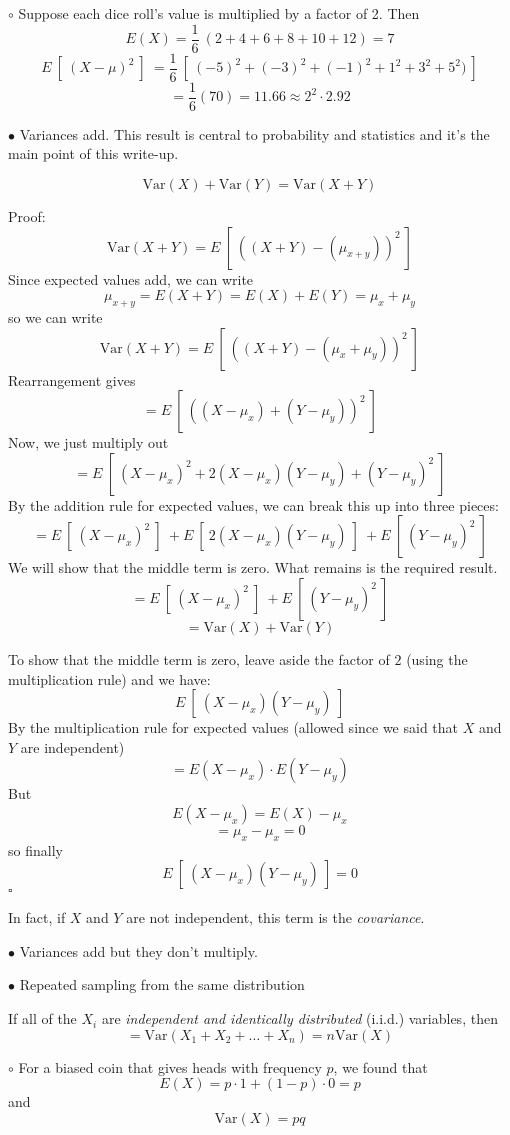 \documentclass[11pt, oneside]{article}   	%
\begin{document}
$\circ$ Suppose each dice roll's value is multiplied by a factor of 2.  Then
\[ E(X) = \frac{1}{6} \ (2 + 4 + 6 + 8 + 10 + 12) = 7 \]
\[ E \ [ \ (X - \mu)^2 \ ] \ = \frac{1}{6} \ [ \  (-5)^2 + (-3)^2 + (-1)^2 + 1^2 + 3^2 + 5^2) \ ]  \]
\[ = \frac{1}{6} (70) = 11.66 \approx 2^2 \cdot 2.92 \]

$\bullet$ Variances add.  This result is central to probability and statistics and it's the main point of this write-up.

\[ \text{Var}(X) + \text{Var}(Y) = \text{Var}(X + Y) \]

Proof:
\[ \text{Var}(X + Y) = E \ [ \ ((X + Y) - (\mu_{x + y}) )^2  \ ]  \]
Since expected values add, we can write 
\[ \mu_{x+y} = E(X+Y) = E(X) + E(Y) = \mu_x + \mu_y \]
so we can write
\[ \text{Var}(X + Y) = E \ [ \ ((X + Y) - (\mu_x + \mu_y) )^2  \ ]  \]
Rearrangement gives
\[ = E \ [ \ ((X - \mu_x) + (Y - \mu_y) )^2  \ ]  \]
Now, we just multiply out
\[ = E \ [ \ (X - \mu_x)^2 + 2( X - \mu_x) (Y - \mu_y) + (Y - \mu_y)^2  \ ]  \]
By the addition rule for expected values, we can break this up into three pieces:
\[ = E \ [ \ (X - \mu_x)^2 \ ] \ + E \ [ \ 2( X - \mu_x) (Y - \mu_y) \ ] \ + E \ [ \ (Y - \mu_y)^2  \ ]  \]
We will show that the middle term is zero.  What remains is the required result.
\[ = E \ [ \ (X - \mu_x)^2 \ ] \ + E \ [ \ (Y - \mu_y)^2  \ ]  \]
\[ = \text{Var}(X) + \text{Var}(Y) \]

To show that the middle term is zero, leave aside the factor of $2$ (using the multiplication rule) and we have:
\[ E \ [ \ (X - \mu_x) (Y - \mu_y) \ ] \]
By the multiplication rule for expected values (allowed since we said that $X$ and $Y$ are independent)
\[ = E(X - \mu_x) \cdot E(Y - \mu_y) \]
But 
\[ E(X - \mu_x) = E(X) - \mu_x \]
\[= \mu_x - \mu_x = 0 \]
so finally
\[ E \ [ \ (X - \mu_x) (Y - \mu_y) \ ] = 0 \]
$\square$

In fact, if $X$ and $Y$ are not independent, this term is the \emph{covariance}.

$\bullet$ Variances add but they don't multiply.

$\bullet$ Repeated sampling from the same distribution

If all of the $X_i$ are \emph{independent and identically distributed} (i.i.d.) variables, then
\[ = \text{Var}(X_1 + X_2 + \dots  + X_n) = n \text{Var}(X) \]

$\circ$ For a biased coin that gives heads with frequency $p$, we found that
\[ E(X) = p \cdot 1 + (1-p) \cdot 0 = p \]
and
\[ \text{Var}(X) = pq \]
\end{document}
